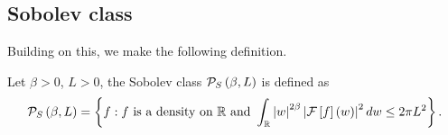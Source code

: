 

\subsection{Sobolev class}
Building on this, we make the following definition.
\begin{definition}
	Let $\beta>0$, $L>0$, the Sobolev class $\mathcal{P}_S\left(\beta,L\right)$ is defined as
	\begin{equation*}
		\mathcal{P}_S\left(\beta,L\right) = \left\{f: f \text{ is a density on }  \mathbb{R} \text{ and } \int_{\mathbb{R}}\left| w\right|^{2\beta} \left| \mathcal{F}\left[f\right]\left(w\right)\right|^2 dw \leq 2\pi L^2\right\}.
	\end{equation*}
\end{definition}
